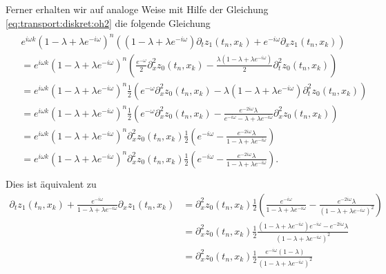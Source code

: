 Ferner erhalten wir auf analoge Weise mit Hilfe der Gleichung \eqref{eq:transport:diskret:oh2}
die folgende Gleichung
\begin{align}
\begin{split}
&e^{i \omega k} (1 - \lambda + \lambda e^{-i \omega})^{n} \left( (1 - \lambda + \lambda e^{-i \omega}) \partial_t z_1(t_n, x_k) + e^{- i \omega} \partial_x z_1(t_n, x_k) \right)\\
&= e^{i \omega k} (1 - \lambda + \lambda e^{-i \omega})^{n} \left( \frac{e^{-\omega}}{2} \partial^2_x z_0(t_n, x_k) - \frac{\lambda(1 - \lambda + \lambda e^{-i \omega})}{2} \partial^2_t z_0(t_n, x_k) \right)\\
&= e^{i \omega k} (1 - \lambda + \lambda e^{-i \omega})^{n} \frac{1}{2} \left( e^{-\omega} \partial^2_x z_0(t_n, x_k) - \lambda (1 - \lambda + \lambda e^{-i \omega}) \partial^2_t z_0(t_n, x_k) \right)\\
&= e^{i \omega k} (1 - \lambda + \lambda e^{-i \omega})^{n} \frac{1}{2} \left( e^{-\omega} \partial^2_x z_0(t_n, x_k) - \frac{e^{- 2i \omega} \lambda}{e^{-i \omega} - \lambda + \lambda e^{-i \omega}} \partial^2_x z_0(t_n, x_k) \right)\\
&= e^{i \omega k} (1 - \lambda + \lambda e^{-i \omega})^{n} \partial^2_x z_0(t_n, x_k) \frac{1}{2} \left( e^{-i \omega} - \frac{e^{- 2 i \omega} \lambda}{1 - \lambda + \lambda e^{-i \omega}}  \right)\\
&= e^{i \omega k} (1 - \lambda + \lambda e^{-i \omega})^{n} \partial^2_x z_0(t_n, x_k) \frac{1}{2} \left( e^{-i \omega} - \frac{e^{- 2 i \omega} \lambda}{1 - \lambda + \lambda e^{-i \omega}}  \right).\\
\end{split}
\end{align}
Dies ist äquivalent zu
\begin{align*}
\partial_t z_1(t_n, x_k) + \frac{e^{- i \omega}}{1 - \lambda + \lambda e^{-i \omega}} \partial_x z_1(t_n, x_k)
&= \partial^2_x z_0(t_n, x_k) \frac{1}{2} \left( \frac{e^{-i \omega}}{1 - \lambda + \lambda e^{-i \omega}} - \frac{e^{- 2 i \omega} \lambda}{(1 - \lambda + \lambda e^{-i \omega})^2}  \right)\\
&= \partial^2_x z_0(t_n, x_k) \frac{1}{2} \frac{ (1 - \lambda + \lambda e^{-i \omega}) e^{-i \omega} - e^{- 2 i \omega} \lambda}{(1 - \lambda + \lambda e^{-i \omega})^2}\\
&= \partial^2_x z_0(t_n, x_k) \frac{1}{2} \frac{ e^{-i \omega} (1- \lambda)}{(1 - \lambda + \lambda e^{-i \omega})^2}
\end{align*}
